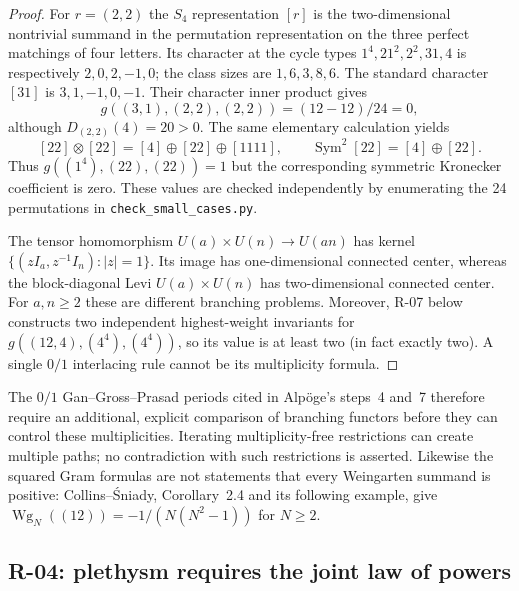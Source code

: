 \documentclass[11pt,a4paper]{article}
\theoremstyle{definition}\newtheorem{definition}{Definition}
\begin{document}
\begin{proof}
For $r=(2,2)$ the $S_4$ representation $[r]$ is the two-dimensional
nontrivial summand in the permutation representation on the three
perfect matchings of four letters. Its character at the cycle types
$1^4,21^2,2^2,31,4$ is respectively $2,0,2,-1,0$; the class sizes are
$1,6,3,8,6$. The standard character $[31]$ is $3,1,-1,0,-1$.
Their character inner product gives
\[
 g((3,1),(2,2),(2,2))=(12-12)/24=0,
\]
although $D_{(2,2)}(4)=20>0$. The same elementary calculation yields
\[
 [22]\otimes[22]=[4]\oplus[22]\oplus[1111],\qquad
 \operatorname{Sym}^2[22]=[4]\oplus[22].
\]
Thus $g((1^4),(22),(22))=1$ but the corresponding symmetric Kronecker
coefficient is zero. These values are checked independently by enumerating
the 24 permutations in \nolinkurl{check_small_cases.py}.

The tensor homomorphism $U(a)\times U(n)\longrightarrow U(an)$ has kernel
$\{(zI_a,z^{-1}I_n):|z|=1\}$. Its image has one-dimensional connected
center, whereas the block-diagonal Levi $U(a)\times U(n)$ has
two-dimensional connected center. For $a,n\geq2$ these are different
branching problems. Moreover, R-07 below constructs two independent
highest-weight invariants for $g((12,4),(4^4),(4^4))$, so its value is at
least two (in fact exactly two). A single $0/1$ interlacing rule cannot
be its multiplicity formula.
\end{proof}

The $0/1$ Gan--Gross--Prasad periods cited in Alp\"oge's steps~4 and~7
therefore require an additional, explicit comparison of branching
functors before they can control these multiplicities. Iterating
multiplicity-free restrictions can create multiple paths; no
contradiction with such restrictions is asserted. Likewise the squared
Gram formulas are not statements that every Weingarten summand is
positive: Collins--\'Sniady, Corollary~2.4 and its following example, give
$\operatorname{Wg}_N((12))=-1/(N(N^2-1))$ for $N\geq2$.

\subsection{R-04: plethysm requires the joint law of powers}
\end{document}

